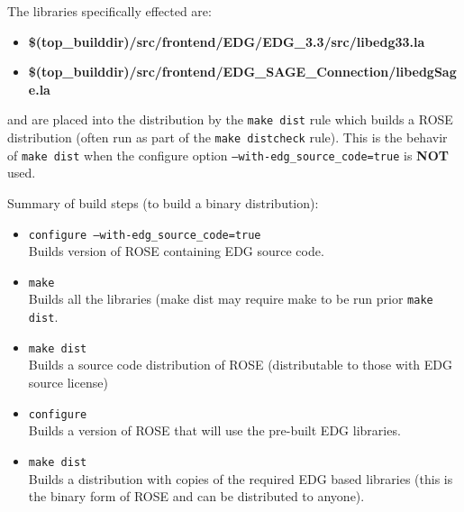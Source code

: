 The libraries specifically effected are:
\begin{itemize}
   \item {\bf \$(top_builddir)/src/frontend/EDG/EDG_3.3/src/libedg33.la}
   \item {\bf \$(top_builddir)/src/frontend/EDG_SAGE_Connection/libedgSage.la}
\end{itemize}
and are placed into the distribution by the {\tt make dist} rule which builds a ROSE distribution
(often run as part of the {\tt make distcheck} rule).  This is the behavir of {\tt make dist}
when the configure option {\tt --with-edg_source_code=true} is {\bf NOT} used.

Summary of build steps (to build a binary distribution):
\begin{itemize}
   \item {\tt configure --with-edg_source_code=true} \\
          Builds version of ROSE containing EDG source code.
   \item  {\tt make} \\
          Builds all the libraries (make dist may require make to be run prior {\tt make dist}.
   \item  {\tt make dist} \\
          Builds a source code distribution of ROSE (distributable to those with EDG source license)
   \item {\tt configure} \\
          Builds a version of ROSE that will use the pre-built EDG libraries.
   \item {\tt make dist} \\
          Builds a distribution with copies of the required EDG based libraries
          (this is the binary form of ROSE and can be distributed to anyone).
\end{itemize}


